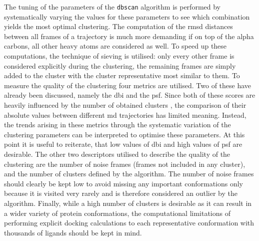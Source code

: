 The tuning of the parameters of the \texttt{dbscan} algorithm is performed by systematically varying the values for these parameters to see which combination yields the most optimal clustering.
The computation of the \gls{rmsd} distances between all frames of a trajectory is much more demanding if on top of the alpha carbons, all other heavy atoms are considered as well.
To speed up these computations, the technique of sieving is utilised: only every other frame is considered explicitly during the clustering, the remaining frames are simply added to the cluster with the cluster representative most similar to them.
To measure the quality of the clustering four metrics are utilised.
Two of these have already been discussed, namely the \gls{dbi} and the \gls{psf}.
Since both of these scores are heavily influenced by the number of obtained clusters \cite{cluster_perf}, the comparison of their absolute values between different \gls{md} trajectories has limited meaning.
Instead, the trends arising in these metrics through the systematic variation of the clustering parameters can be interpreted to optimise these parameters.
At this point it is useful to reiterate, that low values of \gls{dbi} and high values of \gls{psf} are desirable.
The other two descriptors utilised to describe the quality of the clustering are the number of noise frames (frames not included in any cluster), and the number of clusters defined by the algorithm.
The number of noise frames should clearly be kept low to avoid missing any important conformations only because it is visited very rarely and is therefore considered an outlier by the algorithm.
Finally, while a high number of clusters is desirable as it can result in a wider variety of protein conformations, the computational limitations of performing explicit docking calculations to each representative conformation with thousands of ligands should be kept in mind.

